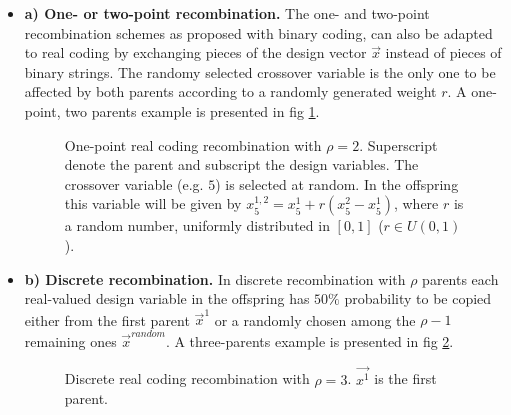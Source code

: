 \begin{itemize}
\item[]{\bf a) One- or two-point recombination.} The one- and two-point recombination schemes as proposed with binary coding, can also be adapted to real coding by exchanging  pieces of the design vector $\vec{x}$ instead of pieces of binary strings. The randomy selected crossover variable is the only one to be affected by both parents according to a randomly generated weight $r$. A one-point, two parents example is presented in fig \ref{1pxreal}.

\begin{figure}[h!]
\begin{minipage}[b]{1.0\linewidth}
 \centering
\end{minipage}
\caption{One-point real coding recombination with $\rho=2$. Superscript denote the parent and subscript the design variables. The crossover variable (e.g. $5$) is selected at random. In the offspring this variable will be given by  $x_5^{1,2}=x_5^{1}+r(x_5^{2}-x_5^{1})$, where $r$ is a random number, uniformly distributed in $[0,1]$ ($r \in U(0,1)$).    
} 
\label{1pxreal}
\end{figure}
 
\pagebreak    
\item[]{\bf b) Discrete recombination.} In discrete recombination with $\rho$ parents each real-valued design variable in the offspring has $50\%$ probability to be copied either from the first parent $\vec{x}^1$ or a randomly chosen among the $\rho-1$ remaining ones $\vec{x}^{random}$. A three-parents example is presented in fig \ref{disc}.

\begin{figure}[h!]
\begin{minipage}[b]{1.0\linewidth}
 \centering
\end{minipage}
\caption{Discrete real coding recombination with $\rho=3$. $\vec{x^1}$ is the first parent.    
} 
\label{disc}
\end{figure}
    

\end{itemize}
